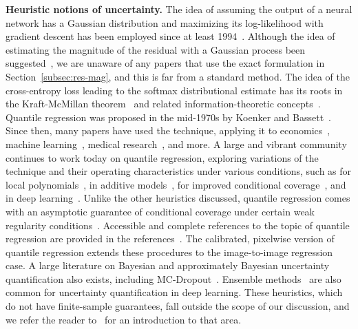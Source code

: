 \documentclass[10pt]{article}
\begin{document}
\textbf{Heuristic notions of uncertainty.} The idea of assuming the output of a neural network has a Gaussian distribution and maximizing its log-likelihood with gradient descent has been employed since at least 1994~\cite{nix1994estimating}.
Although the idea of estimating the magnitude of the residual with a Gaussian process been suggested~\cite{Qiu2020Quantifying}, we are unaware of any papers that use the exact formulation in Section~\ref{subsec:res-mag}, and this is far from a standard method.
The idea of the cross-entropy loss leading to the softmax distributional estimate has its roots in the Kraft-McMillan theorem~\cite{kraft1949device,mcmillan1956two} and related information-theoretic concepts~\cite{cover1999elements}.
Quantile regression was proposed in the mid-1970s by Koenker and Bassett~\cite{koenker1978regression}.
Since then, many papers have used the technique, applying it to economics~\cite{chaney2011quality,mckenzie2007network,machado2005counterfactual}, machine learning~\cite{hwang2005simple,meinshausen2006quantile,natekin2013gradient}, medical research~\cite{armitage2008statistical}, and more.
A large and vibrant community continues to work today on quantile regression, exploring variations of the technique and their operating characteristics under various conditions, such as for local polynomials~\cite{chaudhuri1991global}, in additive models~\cite{koenker2011additive}, for improved conditional coverage~\cite{feldman2021improving}, and in deep learning~\cite{fort2019deep}.
Unlike the other heuristics discussed, quantile regression comes with an asymptotic guarantee of conditional coverage under certain weak regularity conditions~\cite{koenker1978regression,chaudhuri1991global,zhou1996direct,zhou1998statistical,steinwart2011estimating,takeuchi2006nonparametric}.
Accessible and complete references to the topic of quantile regression are provided in the references~\cite{koenker2005quantile,koenker2018handbook}.
The calibrated, pixelwise version of quantile regression extends these procedures to the image-to-image regression case.
A large literature on Bayesian and approximately Bayesian uncertainty quantification also exists, including MC-Dropout~\cite{gal2016dropout}. 
Ensemble methods~\cite{hansen1990neural,lakshminarayanan2017simple,fort2019deep} are also common for uncertainty quantification in deep learning.
These heuristics, which do not have finite-sample guarantees, fall outside the scope of our discussion, and we refer the reader to~\cite{gal2016bayesian} for an introduction to that area.
\end{document}
